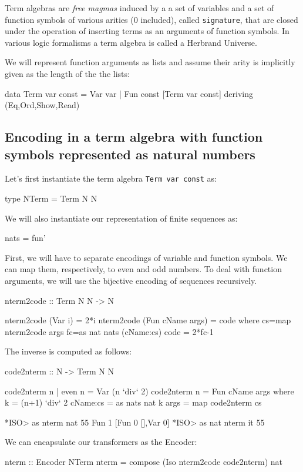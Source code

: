 \documentclass[]{INCLUDES/llncs}
\begin{document}
Term algebras are {\em free magmas} induced by a a set of variables and a
set of function symbols of various arities (0 included), called {\tt signature}, that
are closed under the operation of inserting terms as an arguments of function
symbols. In various logic formalisms a term algebra is called a Herbrand
Universe.

We will represent function arguments as
lists and assume their arity is implicitly given as the length of the
the lists:

\begin{code}
data Term var const = 
   Var var | 
   Fun const [Term var const] 
   deriving (Eq,Ord,Show,Read)
\end{code}


\subsection{Encoding in a term algebra with function symbols represented as
natural numbers}

Let's first instantiate the term algebra {\tt Term var const} as:
\begin{code}
type NTerm = Term N N
\end{code}

We will also instantiate our representation of finite sequences as:
\begin{code}
nats = fun'
\end{code}

First, we will have to separate encodings of variable and function
symbols. We can map them, respectively, to even and odd numbers.
To deal with function arguments, we will use the bijective encoding of sequences
recursively.

\begin{code}
nterm2code :: Term N N -> N

nterm2code (Var i) = 2*i
nterm2code (Fun cName args) = code where
  cs=map nterm2code args
  fc=as nat nats (cName:cs)
  code = 2*fc-1
\end{code}
The inverse is computed as follows:
\begin{code}
code2nterm :: N -> Term N N

code2nterm n | even n = Var (n `div` 2) 
code2nterm n = Fun cName args where
  k = (n+1) `div` 2
  cName:cs = as nats nat k
  args = map code2nterm cs
\end{code}

\begin{codex}
*ISO> as nterm nat 55
Fun 1 [Fun 0 [],Var 0]
*ISO> as nat nterm it
55
\end{codex}
We can encapsulate our transformers as the Encoder:
\begin{code}
nterm :: Encoder NTerm
nterm = compose (Iso nterm2code code2nterm) nat
\end{code}
\end{document}
